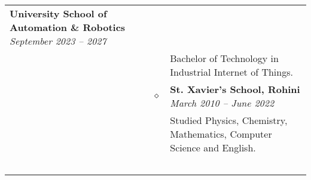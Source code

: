 \documentclass[11pt]{article}
\begin{document}
\begin{tabularx}{\textwidth}{@{}b{90px} b{9px}@{} X@{}}
        \textbf{University School of Automation \& Robotics} \hfill \textit{September 2023 -- 2027} \\ & &
        Bachelor of Technology in Industrial Internet of Things.

        \\ & $\diamond$ &

        \textbf{St. Xavier's School, Rohini} \hfill \textit{March 2010 -- June 2022} \\ & &
        Studied Physics, Chemistry, Mathematics, Computer Science and English.

        \iftoggle{lines}{\\ \\ \hline \\}{\\ \\}

    \end{tabularx}
\end{document}
